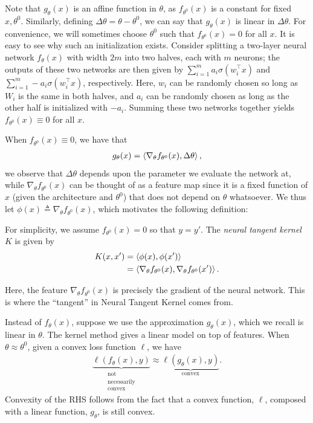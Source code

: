 Note that $g_\theta(x)$ is an affine function in $\theta$, as $f_{\theta^0}(x)$ is a constant for fixed $x,\theta^0$. Similarly, defining $\Delta \theta = \theta-\theta^0$, we can say that $g_\theta(x)$ is linear in $\Delta \theta$. For convenience, we will sometimes choose $\theta^0$ such that $f_{\theta^0}(x) = 0$ for all $x$. It is easy to see why such an initialization exists. Consider splitting a two-layer neural network $f_{\theta}(x)$ with width $2m$ into two halves, each with $m$ neurons; the outputs of these two networks are then given by $\sum_{i=1}^m a_i \sigma (w_i^\top x)$ and $\sum_{i=1}^m -a_i \sigma (w_i^\top x)$, respectively. Here, $w_i$ can be randomly chosen so long as $W_i$ is the same in both halves, and $a_i$ can be randomly chosen as long as the other half is initialized with $-a_i$. Summing these two networks together yields $f_{\theta^0}(x) \equiv 0$ for all $x$.

When $f_{\theta^0}(x) \equiv 0$, we have that 
 \begin{align}
 g_\theta(x)= \left\langle\nabla_\theta f_{\theta^0}(x), \Delta \theta\right\rangle,
\end{align}
we observe that $\Delta \theta$ depends upon the parameter we evaluate the network at, while $\nabla_\theta f_{\theta^0}(x)$ can be thought of as a feature map since it is a fixed function of $x$ (given the architecture and $\theta^0$) that does not depend on $\theta$ whatsoever. We thus let $\phi(x) \triangleq \nabla_\theta f_{\theta^0}(x)$, which motivates the following definition: 

\begin{definition}
For simplicity, we assume $f_{\theta^0}(x)=0$ so that $y=y'$. The \textit{neural tangent kernel} $K$ is given by  
\begin{align} 
    K(x,x') &= \left\langle\phi(x), \phi(x')\right\rangle \\
    &= \left\langle\nabla_\theta f_{\theta^0}(x), \nabla_\theta f_{\theta^0}(x')\right\rangle.
\end{align} 
\end{definition}
Here, the feature $\nabla_\theta f_{\theta^0}(x)$ is precisely the gradient of the neural network. This is where the ``tangent'' in Neural Tangent Kernel comes from. 

Instead of $f_\theta(x)$, suppose we use the approximation $g_\theta(x)$, which we recall is linear in $\theta$. The kernel method gives a linear model on top of features. When $\theta \approx {\theta^0}$, given a convex loss function $\ell$, we have 
\begin{align} 
    \underbrace{\ell (f_\theta(x),y)}_{\substack{\text{not} \\ \text{necessarily} \\ \text{convex}}} \approx \underbrace{\ell(g_\theta(x),y)}_{\text{convex}}.
\end{align} 
Convexity of the RHS follows from the fact that a convex function, $\ell$, composed with a linear function, $g_\theta$, is still convex. 

